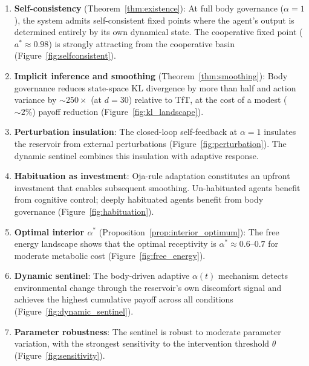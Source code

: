 \documentclass[11pt,a4paper]{article}
\theoremstyle{definition}
\begin{document}
\begin{enumerate}[label=(\roman*)]
  \item \textbf{Self-consistency} (Theorem~\ref{thm:existence}):
    At full body governance ($\alpha = 1$), the system admits self-consistent
    fixed points where the agent's output is determined entirely by its own
    dynamical state.  The cooperative fixed point ($a^{*} \approx 0.98$)
    is strongly attracting from the cooperative basin (Figure~\ref{fig:selfconsistent}).

  \item \textbf{Implicit inference and smoothing} (Theorem~\ref{thm:smoothing}):
    Body governance reduces state-space KL divergence by more than half and
    action variance by $\sim 250\times$ (at $d = 30$) relative to TfT, at
    the cost of a modest ($\sim 2\%$) payoff reduction
    (Figure~\ref{fig:kl_landscape}).

  \item \textbf{Perturbation insulation}:
    The closed-loop self-feedback at $\alpha = 1$ insulates the reservoir
    from external perturbations (Figure~\ref{fig:perturbation}).
    The dynamic sentinel combines this insulation with adaptive response.

  \item \textbf{Habituation as investment}:
    Oja-rule adaptation constitutes an upfront investment that enables
    subsequent smoothing.  Un-habituated agents benefit from cognitive
    control; deeply habituated agents benefit from body governance
    (Figure~\ref{fig:habituation}).

  \item \textbf{Optimal interior $\alpha^{*}$}
    (Proposition~\ref{prop:interior_optimum}):
    The free energy landscape shows that the optimal receptivity is
    $\alpha^{*} \approx 0.6$--$0.7$ for moderate metabolic cost
    (Figure~\ref{fig:free_energy}).

  \item \textbf{Dynamic sentinel}:
    The body-driven adaptive $\alpha(t)$ mechanism detects environmental
    change through the reservoir's own discomfort signal and achieves the
    highest cumulative payoff across all conditions
    (Figure~\ref{fig:dynamic_sentinel}).

  \item \textbf{Parameter robustness}:
    The sentinel is robust to moderate parameter variation, with the
    strongest sensitivity to the intervention threshold $\theta$
    (Figure~\ref{fig:sensitivity}).


\end{enumerate}
\end{document}

